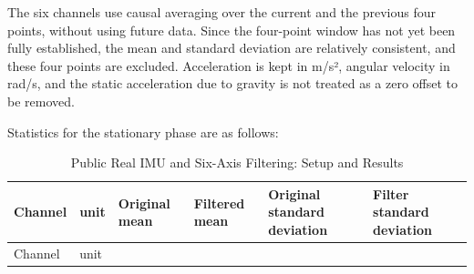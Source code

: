 The six channels use causal averaging over the current and the previous four points, without using future data. Since the four-point window has not yet been fully established, the mean and standard deviation are relatively consistent, and these four points are excluded. Acceleration is kept in m/s², angular velocity in rad/s, and the static acceleration due to gravity is not treated as a zero offset to be removed.

Statistics for the stationary phase are as follows:

\FloatBarrier\begingroup\small\setlength{\tabcolsep}{2.5pt}
\begin{longtable}[]{@{}
  >{\raggedright\arraybackslash}p{}
  >{\raggedright\arraybackslash}p{}
  >{\raggedright\arraybackslash}p{}
  >{\raggedright\arraybackslash}p{}
  >{\raggedright\arraybackslash}p{}
  >{\raggedright\arraybackslash}p{}@{}}
\caption{Public Real IMU and Six-Axis Filtering: Setup and Results}\label{tab:s07-2}\tabularnewline
\toprule\noalign{}
\begin{minipage}[b]{\linewidth}\raggedright
Channel
\end{minipage} & \begin{minipage}[b]{\linewidth}\raggedright
unit
\end{minipage} & \begin{minipage}[b]{\linewidth}\raggedright
Original mean
\end{minipage} & \begin{minipage}[b]{\linewidth}\raggedright
Filtered mean
\end{minipage} & \begin{minipage}[b]{\linewidth}\raggedright
Original standard deviation
\end{minipage} & \begin{minipage}[b]{\linewidth}\raggedright
Filter standard deviation
\end{minipage} \\
\midrule\noalign{}
\endfirsthead
\toprule\noalign{}
\begin{minipage}[b]{\linewidth}\raggedright
Channel
\end{minipage} & \begin{minipage}[b]{\linewidth}\raggedright
unit
\end{minipage} & \begin{minipage}[b]{\linewidth}\raggedright

\end{minipage}
\end{longtable}
